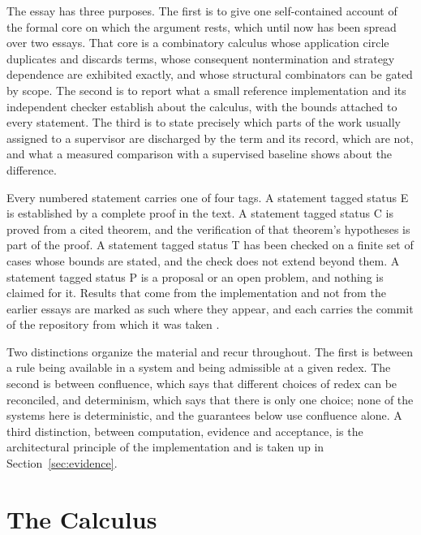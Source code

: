 \documentclass[11pt]{article}
\theoremstyle{definition}
\theoremstyle{remark}
\begin{document}
The essay has three purposes. The first is to give one self-contained account of the formal core on which the argument rests, which until now has been spread over two essays. That core is a combinatory calculus whose application circle duplicates and discards terms, whose consequent nontermination and strategy dependence are exhibited exactly, and whose structural combinators can be gated by scope. The second is to report what a small reference implementation and its independent checker establish about the calculus, with the bounds attached to every statement. The third is to state precisely which parts of the work usually assigned to a supervisor are discharged by the term and its record, which are not, and what a measured comparison with a supervised baseline shows about the difference.

Every numbered statement carries one of four tags. A statement tagged status E is established by a complete proof in the text. A statement tagged status C is proved from a cited theorem, and the verification of that theorem's hypotheses is part of the proof. A statement tagged status T has been checked on a finite set of cases whose bounds are stated, and the check does not extend beyond them. A statement tagged status P is a proposal or an open problem, and nothing is claimed for it. Results that come from the implementation and not from the earlier essays are marked as such where they appear, and each carries the commit of the repository from which it was taken \citep{kernel}.

Two distinctions organize the material and recur throughout. The first is between a rule being available in a system and being admissible at a given redex. The second is between confluence, which says that different choices of redex can be reconciled, and determinism, which says that there is only one choice; none of the systems here is deterministic, and the guarantees below use confluence alone. A third distinction, between computation, evidence and acceptance, is the architectural principle of the implementation and is taken up in Section~\ref{sec:evidence}.

\section{The Calculus}\label{sec:calculus}
\end{document}
